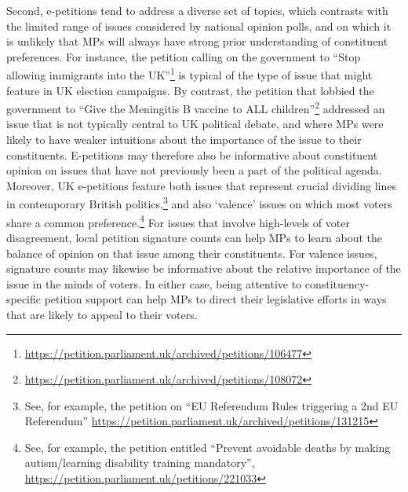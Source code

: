 \documentclass[12pt]{article}
\begin{document}
Second, e-petitions tend to address a diverse set of topics, which contrasts with the limited range of issues considered by national opinion polls, and on which it is unlikely that MPs will always have strong prior understanding of constituent preferences. For instance, the petition calling on the government to ``Stop allowing immigrants into the UK''\footnote{\url{https://petition.parliament.uk/archived/petitions/106477}} is typical of the type of issue that might feature in UK election campaigns. By contrast, the petition that lobbied the government to ``Give the Meningitis B vaccine to ALL children''\footnote{\url{https://petition.parliament.uk/archived/petitions/108072}} addressed an issue that is not typically central to UK political debate, and where MPs were likely to have weaker intuitions about the importance of the issue to their constituents. E-petitions may therefore also be informative about constituent opinion on issues that have not previously been a part of the political agenda. Moreover, UK e-petitions feature both issues that represent crucial dividing lines in contemporary British politics,\footnote{See, for example, the petition on ``EU Referendum Rules triggering a 2nd EU Referendum'' \url{https://petition.parliament.uk/archived/petitions/131215}} and also `valence' issues on which most voters share a common preference.\footnote{See, for example, the petition entitled ``Prevent avoidable deaths by making autism/learning disability training mandatory'', \url{https://petition.parliament.uk/petitions/221033}} For issues that involve high-levels of voter disagreement, local petition signature counts can help MPs to learn about the balance of opinion on that issue among their constituents. For valence issues, signature counts may likewise be informative about the relative importance of the issue in the minds of voters. In either case, being attentive to constituency-specific petition support can help MPs to direct their legislative efforts in ways that are likely to appeal to their voters. 
\end{document}
